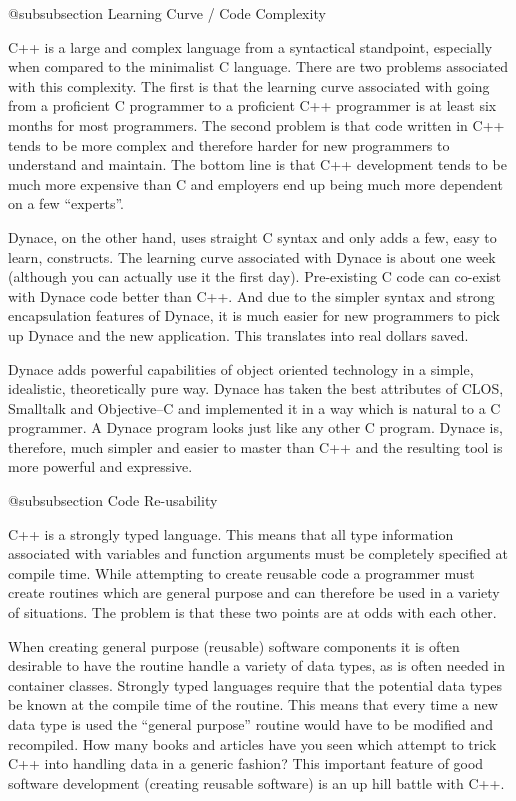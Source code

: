 @subsubsection Learning Curve / Code Complexity

C++ is a large and complex language from a syntactical standpoint,
especially when compared to the minimalist C language.  There are two
problems associated with this complexity.  The first is that the
learning curve associated with going from a proficient C programmer to
a proficient C++ programmer is at least six months for most
programmers.  The second problem is that code written in C++ tends
to be more complex and therefore harder for new programmers to
understand and maintain.  The bottom line is that C++ development
tends to be much more expensive than C and employers end up being
much more dependent on a few ``experts''.

Dynace, on the other hand, uses straight C syntax and only adds a few,
easy to learn, constructs.  The learning curve associated with Dynace
is about one week (although you can actually use it the first day).
Pre-existing C code can co-exist with Dynace code better than C++.
And due to the simpler syntax and strong encapsulation features of
Dynace, it is much easier for new programmers to pick up Dynace and
the new application.  This translates into real dollars saved.

Dynace adds powerful capabilities of object oriented technology in a
simple, idealistic, theoretically pure way.  Dynace has taken the best
attributes of CLOS, Smalltalk and Objective--C and implemented it in a
way which is natural to a C programmer.  A Dynace program looks just
like any other C program.  Dynace is, therefore, much simpler and easier
to master than C++ and the resulting tool is more powerful and expressive.

@subsubsection Code Re-usability

C++ is a strongly typed language.  This means that all type information
associated with variables and function arguments must be completely
specified at compile time.  While attempting to create reusable code
a programmer must create routines which are general purpose and can
therefore be used in a variety of situations.  The problem is that
these two points are at odds with each other.

When creating general purpose (reusable) software components it is often
desirable to have the routine handle a variety of data types, as is
often needed in container classes.  Strongly typed languages require
that the potential data types be known at the compile time of the routine.
This means that every time a new data type is used the ``general purpose''
routine would have to be modified and recompiled.  How many books and
articles have you seen which attempt to trick C++ into handling data
in a generic fashion?  This important feature of good software development
(creating reusable software) is an up hill battle with C++.


